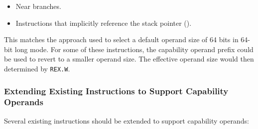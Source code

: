 \begin{itemize}
  \item Near branches.

  \item Instructions that implicitly reference
    the stack pointer (\CSP{}).
\end{itemize}

This matches the approach used to select a default operand size of 64
bits in 64-bit long mode.  For some of these instructions, the
capability operand prefix could be used to revert to a smaller operand
size.  The effective operand size would then determined by \texttt{REX.W}.

\subsubsection{Extending Existing Instructions to Support Capability Operands}

Several existing instructions should be extended to support
capability operands:

